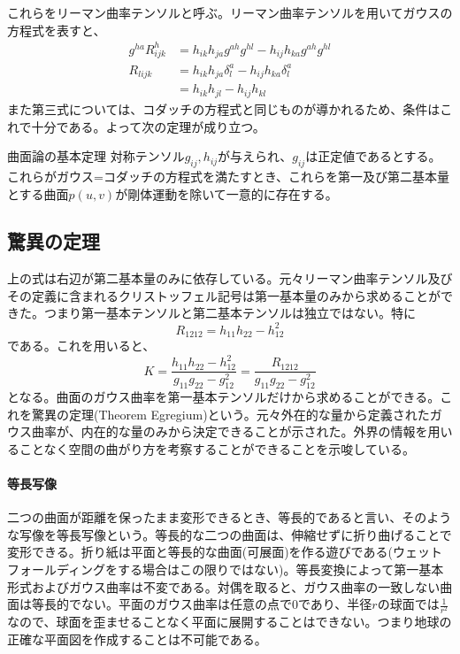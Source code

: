         これらをリーマン曲率テンソルと呼ぶ。リーマン曲率テンソルを用いてガウスの方程式を表すと、
        \begin{align*}
            g^{ha}R^h_{ijk} &= h_{ik}h_{ja}g^{ah}g^{hl} - h_{ij}h_{ka}g^{ah}g^{hl}\\
            R_{lijk} &= h_{ik}h_{ja}\delta_l^a - h_{ij}h_{ka}\delta_l^a\\
            &= h_{ik}h_{jl} - h_{ij}h_{kl}
        \end{align*}
        また第三式については、コダッチの方程式と同じものが導かれるため、条件はこれで十分である。よって次の定理が成り立つ。
        \begin{thm}{曲面論の基本定理}
            対称テンソル$g_{ij}, h_{ij}$が与えられ、$g_{ij}$は正定値であるとする。これらがガウス=コダッチの方程式を満たすとき、これらを第一及び第二基本量とする曲面$p(u,v)$が剛体運動を除いて一意的に存在する。
        \end{thm}


    \subsection{驚異の定理}
        上の式は右辺が第二基本量のみに依存している。元々リーマン曲率テンソル及びその定義に含まれるクリストッフェル記号は第一基本量のみから求めることができた。つまり第一基本テンソルと第二基本テンソルは独立ではない。特に
            \[R_{1212} = h_{11}h_{22} - h_{12}^2\]
        である。これを用いると、
            \[K = \frac{h_{11}h_{22} - h_{12}^2}{g_{11}g_{22} - g_{12}^2} = \frac{R_{1212}}{g_{11}g_{22}-g_{12}^2}\]
        となる。曲面のガウス曲率を第一基本テンソルだけから求めることができる。これを驚異の定理(Theorem Egregium)という。元々外在的な量から定義されたガウス曲率が、内在的な量のみから決定できることが示された。外界の情報を用いることなく空間の曲がり方を考察することができることを示唆している。


    \paragraph{等長写像}
        二つの曲面が距離を保ったまま変形できるとき、等長的であると言い、そのような写像を等長写像という。等長的な二つの曲面は、伸縮せずに折り曲げることで変形できる。折り紙は平面と等長的な曲面(可展面)を作る遊びである(ウェットフォールディングをする場合はこの限りではない)。等長変換によって第一基本形式およびガウス曲率は不変である。対偶を取ると、ガウス曲率の一致しない曲面は等長的でない。平面のガウス曲率は任意の点で0であり、半径$r$の球面では$\frac{1}{r^2}$なので、球面を歪ませることなく平面に展開することはできない。つまり地球の正確な平面図を作成することは不可能である。
